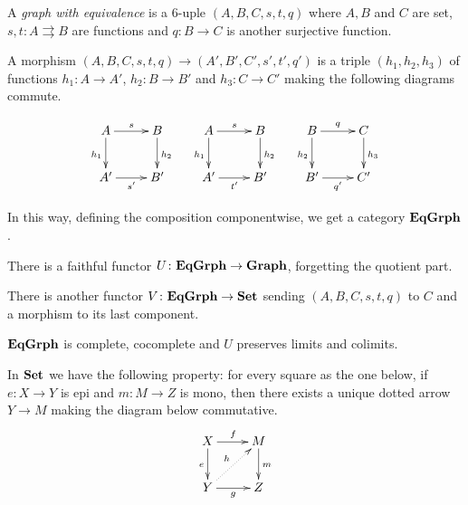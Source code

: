 \begin{definition}
	A \emph{graph with equivalence} is a 6-uple $(A, B, C, s, t, q)$ where $A, B$ and $C$ are set, $s,t\colon A\rightrightarrows B$ are functions and $q\colon B\to C$ is another surjective function.
	
	A morphism  $(A, B, C, s, t, q)\to (A', B', C', s', t', q')$ is a triple $(h_1, h_2, h_3)$ of functions $h_1\colon A\to A'$, $h_2\colon B\to B'$ and $h_3\colon C\to C'$ making the following diagrams commute.
	
	\[\xymatrix{A \ar[r]^{s} \ar[d]_{h_1} & B \ar[d]^{h_2} & A \ar[r]^{s} \ar[d]_{h_1}& B \ar[d]^{h_2} & B \ar[d]_{h_2} \ar[r]^{q} & C \ar[d]^{h_3}\\A' \ar[r]_{s'} & B' & A ' \ar[r]_{t'}& B' & B' \ar[r]_{q'} & C'}\]
	
	In this way, defining the composition componentwise, we get a category $\mathbf{EqGrph}$.
\end{definition}

\begin{remark}\label{rem:fedele}
	There is a faithful functor $U\colon \mathbf{EqGrph}\to \mathbf{Graph}$, forgetting the quotient part. 
\end{remark}

\begin{remark}
There is another functor $V\colon \mathbf{EqGrph}\to \mathbf{Set}$ sending $(A, B,C, s,t, q)$ to $C$ and a morphism to its last component.	
\end{remark}


\begin{prop}\label{prop:limits}
	$\mathbf{EqGrph}$ is complete, cocomplete and $U$ preserves limits and colimits.
\end{prop}

\begin{remark}\label{rem:ima}In $\mathbf{Set}$ we have the following property: for every square as the one below, if $e\colon X\to Y$ is epi and $m\colon M\to Z$ is mono, then there exists a unique dotted arrow $Y\to M$ making the diagram below commutative.
	\[\xymatrix{X \ar[r]^{f} \ar[d]_{e}& M \ar[d]^{m}\\ Y \ar[r]_{g} \ar@{.>}[ur]^{h}& Z}\] 
\end{remark}


